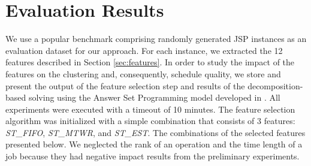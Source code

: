 \documentclass[runningheads]{llncs}
\newcommand{\stest}{\textit{ST\_EST}\xspace}
\newcommand{\stmtwr}{\textit{ST\_MTWR}\xspace}
\newcommand{\stfifo}{\textit{ST\_FIFO}\xspace}
\begin{document}

\section{Evaluation Results}
\label{sec:eval}
We use a popular benchmark \cite{taillard1993benchmarks} comprising randomly generated JSP instances as an evaluation dataset for our approach.
For each instance, we extracted the 12 features described in Section \ref{sec:features}. In order to study the impact of the features on the clustering and, consequently, schedule quality, we store and present the output of the feature selection step and results of the decomposition-based solving using the Answer Set Programming model developed in \cite{el2020job}.
All experiments were executed with a timeout of 10 minutes. 
The feature selection algorithm was initialized with a simple combination that consists of $3$ features: \stfifo, \stmtwr, and \stest. The combinations of the selected features presented below. We neglected the rank of an operation and the time length of a job because they had negative impact results from the preliminary experiments.
\end{document}
